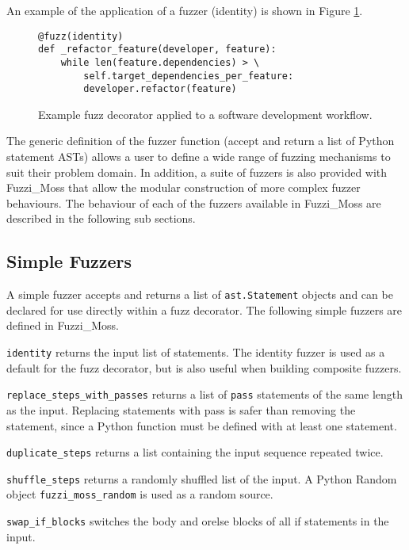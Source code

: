 \documentclass{sig-alternate}
\newenvironment{FunctionList}{%
\lstset{basicstyle=\ttfamily\bfseries\small}
\begin{list}{}{\leftmargin=5pt}
}{\end{list}\lstset{basicstyle=\ttfamily\small}}
\begin{document}
An example of the application of a fuzzer (identity) is shown in Figure
\ref{fig:fuzz}.

 \begin{figure}
   \centering
  \begin{lstlisting}
@fuzz(identity)
def _refactor_feature(developer, feature):
    while len(feature.dependencies) > \
        self.target_dependencies_per_feature:
        developer.refactor(feature)
  \end{lstlisting}
  
  \caption{Example fuzz decorator applied to a software development workflow.}
  \label{fig:fuzz}
\end{figure}

The generic definition of the fuzzer function (accept and return a list of
Python statement ASTs) allows a user to define a wide range of fuzzing
mechanisms to suit their problem domain.  In addition, a suite of fuzzers is
also provided with Fuzzi\_Moss that allow the modular construction of more
complex fuzzer behaviours.  The behaviour of each of the fuzzers available in
Fuzzi\_Moss are described in the following sub sections.


\subsection{Simple Fuzzers}


A simple fuzzer accepts and returns a list of \lstinline!ast.Statement! objects
and can be declared for use directly within a fuzz decorator.  The following
simple fuzzers are defined in Fuzzi\_Moss.

\begin{FunctionList}

\item\lstinline!identity! returns the input list of statements.  The identity
  fuzzer is used as a default for the fuzz decorator, but is also useful when
  building composite fuzzers.

\item\lstinline!replace_steps_with_passes! returns a list of \lstinline!pass!
  statements of the same length as the input.  Replacing statements with pass is
  safer than removing the statement, since a Python function must be defined
  with at least one statement.

\item\lstinline!duplicate_steps! returns a list containing the input sequence
  repeated twice.

\item\lstinline!shuffle_steps! returns a randomly shuffled list of the input.  A
  Python Random object \lstinline!fuzzi_moss_random! is used as a random source.

\item \lstinline!swap_if_blocks! switches the body and orelse blocks of all if
  statements in the input.

\end{FunctionList}
\end{document}
